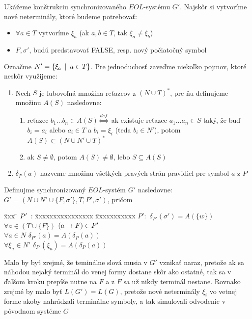 \begin{dokaz}
    Ukážeme konštrukciu synchronizovaného $EOL$-systému $G'$. Najskôr
    si vytvoríme nové neterminály, ktoré budeme potrebovať:
    \begin{itemize}
    \item $\forall a\in T$ vytvoríme $\xi_a$ (ak $a,b\in T$, tak
    $\xi_a\neq\xi_b$)
    \item $F,\sigma'$, budú predstavovať FALSE, resp. nový počiatočný
    symbol
    \end{itemize}
    Označme $N'=\{\xi_a\enspace |\enspace a\in T\}$. Pre jednoduchosť zaveďme
    niekoľko pojmov, ktoré neskôr využijeme:
    \begin{enumerate}
    \item Nech $S$ je ľubovoľná množina reťazcov z $(N\cup T)^*$, pre
    ňu definujeme množinu $A(S)$ nasledovne:
    \begin{enumerate}
    \item reťazec $b_{1}\dots b_{n}\in A(S)\overset{def}
    \Longleftrightarrow$ ak existuje reťazec $a_{1}\dots a_{n}\in S$
    taký, že buď $b_i=a_i$ alebo $a_i\in T$ a $b_i=\xi_i$ (teda
    $b_i\in N'$), potom $A(S)\subset(N\cup N'\cup T)^*$
    \item ak $S\neq\emptyset$, potom $A(S)\neq\emptyset$, lebo
    $S\subseteq A(S)$
    \end{enumerate}
    \item $\delta_P(a)$ nazveme množinu všetkých pravých strán
    pravidiel pre symbol $a$ z $P$
    \end{enumerate}
    Definujme synchronizovaný $EOL$-systém $G'$ nasledovne: $G'=(N\cup
    N'\cup\{F,\sigma'\},T,P',\sigma')$, pričom
    \begin{tabbing}
    \= xxx \= $P'\enspace$: \= xxxxxxxxxxxxxxxx \= xxxxxxxxxxx \kill \>\>
    $P':$ \> $\delta_{P'}(\sigma')=A(\{w\})$\\ \>\>\> $\forall
    a\in(T\cup \{F\})$ \> $(a\rightarrow F)\in P'$\\ \>\>\> $\forall a\in N$
    \> $\delta_{P'}(a)=A(\delta_P(a))$\\ \>\>\> $\forall\xi_a\in N'$
    \> $\delta_{P'}(\xi_a)=A(\delta_P(a))$
    \end{tabbing}
    Malo by byť zrejmé, že teminálne slová musia v $G'$ vznikať naraz,
    pretože ak sa náhodou nejaký terminál do venej formy dostane skôr
    ako ostatné, tak sa v ďaľšom kroku prepíše nutne na $F$ a z $F$ sa
    už nikdy terminál nestane. Rovnako zrejmé by malo byť
    $L(G')=L(G)$, pretože nové neterminály $\xi_i$ vo vetnej forme
    akoby nahrádzali terminálne symboly, a tak simulovali odvodenie v
    pôvodnom systéme $G$
\end{dokaz}

